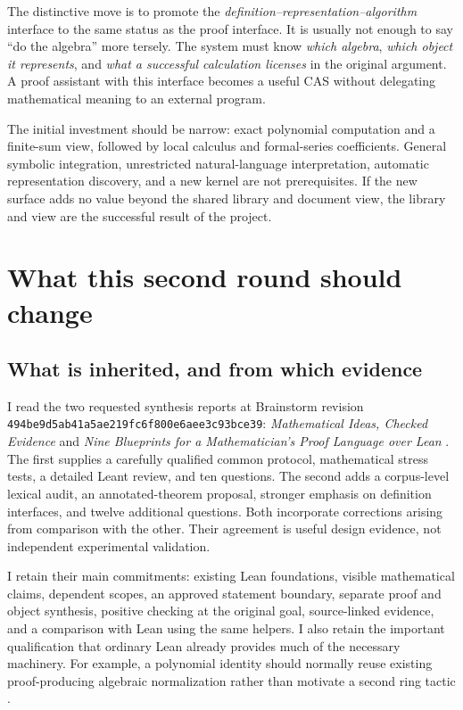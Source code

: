 \documentclass[11pt,letterpaper]{article}
\newcommand{\code}[1]{\nolinkurl{#1}}
\numberwithin{equation}{section}
\begin{document}
The distinctive move is to promote the \emph{definition--representation--algorithm}
interface to the same status as the proof interface. It is usually not enough to
say ``do the algebra'' more tersely. The system must know \emph{which algebra},
\emph{which object it represents}, and \emph{what a successful calculation licenses}
in the original argument. A proof assistant with this interface becomes a useful
CAS without delegating mathematical meaning to an external program.

The initial investment should be narrow: exact polynomial computation and a
finite-sum view, followed by local calculus and formal-series coefficients. General
symbolic integration, unrestricted natural-language interpretation, automatic
representation discovery, and a new kernel are not prerequisites. If the new
surface adds no value beyond the shared library and document view, the library
and view are the successful result of the project.

\clearpage
\begingroup
\setlength{\parskip}{0pt}
\small
\tableofcontents
\endgroup
\clearpage

\section{What this second round should change}\label{sec:round}
\subsection{What is inherited, and from which evidence}
I read the two requested synthesis reports at Brainstorm revision
\code{494be9d5ab41a5ae219fc6f800e6aee3c93bce39}: \emph{Mathematical Ideas, Checked
Evidence} and \emph{Nine Blueprints for a Mathematician's Proof Language over Lean}
\cite{synthesis,blueprints}. The first supplies a carefully qualified common
protocol, mathematical stress tests, a detailed Leant review, and ten questions.
The second adds a corpus-level lexical audit, an annotated-theorem proposal,
stronger emphasis on definition interfaces, and twelve additional questions.
Both incorporate corrections arising from comparison with the other. Their
agreement is useful design evidence, not independent experimental validation.

I retain their main commitments: existing Lean foundations, visible mathematical
claims, dependent scopes, an approved statement boundary, separate proof and
object synthesis, positive checking at the original goal, source-linked evidence,
and a comparison with Lean using the same helpers. I also retain the important
qualification that ordinary Lean already provides much of the necessary machinery.
For example, a polynomial identity should normally reuse existing proof-producing
algebraic normalization rather than motivate a second ring tactic
\cite{ring,synthesis,blueprints}.
\end{document}
